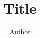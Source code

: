 \documentclass{Notes-Format}
\title{Title}
\author{Author}
\begin{document}
\settitlepage%



\newpage

\printbibliography%
\end{document}
